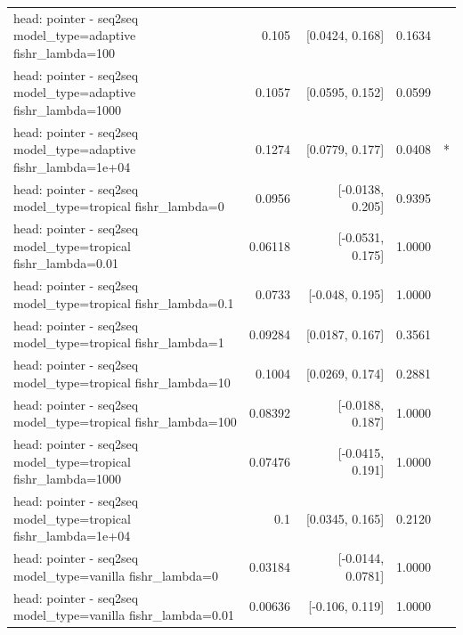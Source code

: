 \documentclass[10pt]{article}
\makeatletter
\newcommand{\stackcell}[1]{\begin{tabular}[t]{@{}l@{}}#1\end{tabular}}
\makeatother
\begin{document}
{\begin{longtable}{lrrrl}
\stackcell{head: pointer - seq2seq\\\footnotesize model\_type=adaptive fishr\_lambda=100 } & 0.105 & [0.0424, 0.168] & 0.1634 & \\
\stackcell{head: pointer - seq2seq\\\footnotesize model\_type=adaptive fishr\_lambda=1000 } & 0.1057 & [0.0595, 0.152] & 0.0599 & \\
\stackcell{head: pointer - seq2seq\\\footnotesize model\_type=adaptive fishr\_lambda=1e+04 } & 0.1274 & [0.0779, 0.177] & 0.0408 & *\\
\stackcell{head: pointer - seq2seq\\\footnotesize model\_type=tropical fishr\_lambda=0 } & 0.0956 & [-0.0138, 0.205] & 0.9395 & \\
\stackcell{head: pointer - seq2seq\\\footnotesize model\_type=tropical fishr\_lambda=0.01 } & 0.06118 & [-0.0531, 0.175] & 1.0000 & \\
\stackcell{head: pointer - seq2seq\\\footnotesize model\_type=tropical fishr\_lambda=0.1 } & 0.0733 & [-0.048, 0.195] & 1.0000 & \\
\stackcell{head: pointer - seq2seq\\\footnotesize model\_type=tropical fishr\_lambda=1 } & 0.09284 & [0.0187, 0.167] & 0.3561 & \\
\stackcell{head: pointer - seq2seq\\\footnotesize model\_type=tropical fishr\_lambda=10 } & 0.1004 & [0.0269, 0.174] & 0.2881 & \\
\stackcell{head: pointer - seq2seq\\\footnotesize model\_type=tropical fishr\_lambda=100 } & 0.08392 & [-0.0188, 0.187] & 1.0000 & \\
\stackcell{head: pointer - seq2seq\\\footnotesize model\_type=tropical fishr\_lambda=1000 } & 0.07476 & [-0.0415, 0.191] & 1.0000 & \\
\stackcell{head: pointer - seq2seq\\\footnotesize model\_type=tropical fishr\_lambda=1e+04 } & 0.1 & [0.0345, 0.165] & 0.2120 & \\
\stackcell{head: pointer - seq2seq\\\footnotesize model\_type=vanilla fishr\_lambda=0 } & 0.03184 & [-0.0144, 0.0781] & 1.0000 & \\
\stackcell{head: pointer - seq2seq\\\footnotesize model\_type=vanilla fishr\_lambda=0.01 } & 0.00636 & [-0.106, 0.119] & 1.0000 & \\

\end{longtable}}
\end{document}
